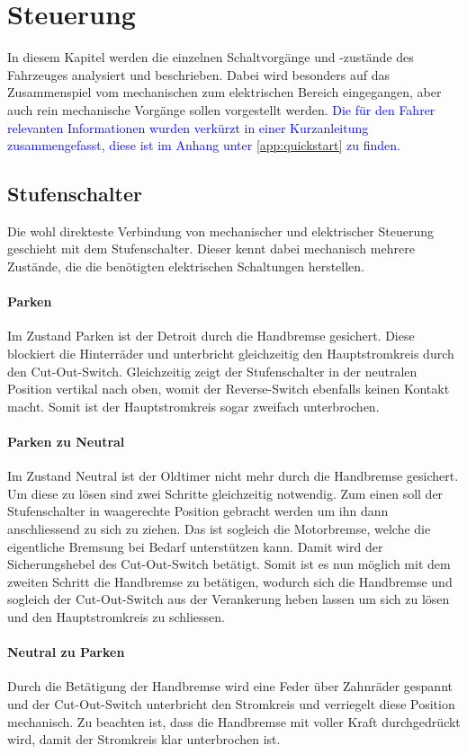 \section{Steuerung}
In diesem Kapitel werden die einzelnen Schaltvorgänge und -zustände des Fahrzeuges analysiert und beschrieben. Dabei wird besonders auf das Zusammenspiel vom mechanischen zum elektrischen Bereich eingegangen, aber auch rein mechanische Vorgänge sollen vorgestellt werden. \textcolor{blue}{Die für den Fahrer relevanten Informationen wurden verkürzt in einer Kurzanleitung zusammengefasst, diese ist im Anhang unter \ref{app:quickstart} zu finden.}

\subsection{Stufenschalter}
Die wohl direkteste Verbindung von mechanischer und elektrischer Steuerung geschieht mit dem Stufenschalter. Dieser kennt dabei mechanisch mehrere Zustände, die die benötigten elektrischen Schaltungen herstellen.

\paragraph{Parken}
Im Zustand Parken ist der Detroit durch die Handbremse gesichert. Diese blockiert die Hinterräder und unterbricht gleichzeitig den Hauptstromkreis durch den Cut-Out-Switch. Gleichzeitig zeigt der Stufenschalter in der neutralen Position vertikal nach oben, womit der Reverse-Switch ebenfalls keinen Kontakt macht. Somit ist der Hauptstromkreis sogar zweifach unterbrochen.

\paragraph{Parken zu Neutral}
Im Zustand Neutral ist der Oldtimer nicht mehr durch die Handbremse gesichert. Um diese zu lösen sind zwei Schritte gleichzeitig notwendig. Zum einen soll der Stufenschalter in waagerechte Position gebracht werden um ihn dann anschliessend zu sich zu ziehen. Das ist sogleich die Motorbremse, welche die eigentliche Bremsung bei Bedarf unterstützen kann. Damit wird der Sicherungshebel des Cut-Out-Switch betätigt. Somit ist es nun möglich mit dem zweiten Schritt die Handbremse zu betätigen, wodurch sich die Handbremse und sogleich der Cut-Out-Switch aus der Verankerung heben lassen um sich zu lösen und den Hauptstromkreis zu schliessen.

\paragraph{Neutral zu Parken}
Durch die Betätigung der Handbremse wird eine Feder über Zahnräder gespannt und der Cut-Out-Switch unterbricht den Stromkreis und verriegelt diese Position mechanisch. Zu beachten ist, dass die Handbremse mit voller Kraft durchgedrückt wird, damit der Stromkreis klar unterbrochen ist.

